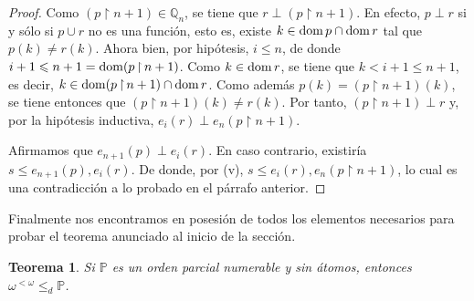 \documentclass[11pt]{unam_tesis1}
\theoremstyle{MyThmStyle}
\theoremstyle{definition}
\theoremstyle{plain}
\newtheorem{theorem}[definition]{Teorema}
\theoremstyle{remark}
\def\dom{\mathop{\rm dom}\nolimits}
\def\rest{\mathop{\upharpoonright}\nolimits}
\let\leq\leqslant
\begin{document}
\begin{proof}
Como $(p\rest n+1)\in \mathbb Q_n$, se tiene que $r\perp (p\rest n+1)$. En efecto, $p\perp r$ si y s\'olo si $p\cup r$ no es una funci\'on, esto es, existe $k\in \dom p\cap \dom r$ tal que $p(k)\neq r(k)$. Ahora bien, por hip\'otesis, $i\leq n$, de donde $i+1\leq n+1=\dom (p\rest {n+1})$. Como $k\in \dom r$, se tiene que $k< i+1\leq n+1$, es decir, $k\in \dom(p\rest {n+1})\cap \dom r$. Como adem\'as $p(k)=(p\rest n+1)(k)$, se tiene entonces que $(p\rest n+1)(k)\neq r(k)$. Por tanto, $(p\rest n+1)\perp r$ y, por la hip\'otesis inductiva, $e_i(r)\perp e_n(p\rest n+1)$. 

Afirmamos que $e_{n+1}(p)\perp e_i(r)$. En caso contrario, existir\'ia $s\leq e_{n+1}(p), e_i(r)$. De donde, por (v), $s\leq e_i(r), e_n(p\rest n+1)$, lo cual es una contradicci\'on a lo probado en el p\'arrafo anterior.
\end{proof}

Finalmente nos encontramos en posesi\'on de todos los elementos necesarios para probar el teorema anunciado al inicio de la secci\'on.

\begin{theorem}\label{cohen}
Si $\mathbb P$ es un orden parcial numerable y sin \'atomos, entonces $\omega^{<\omega}\leqslant_{d} \mathbb P$.
\end{theorem}
\end{document}

